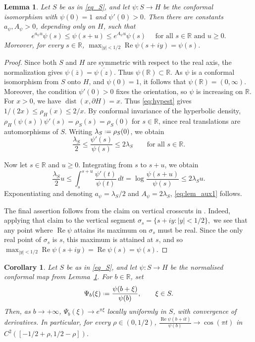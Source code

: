 \documentclass[a4paper, 11pt, reqno]{amsart}
\numberwithin{equation}{section}
\theoremstyle{plain}
\newtheorem{corollary}[theorem]{Corollary}
\newtheorem{lemma}[theorem]{Lemma}
\newcommand*{\defeq}{\mathrel{\vcenter{\baselineskip0.5ex \lineskiplimit0pt
 \hbox{\scriptsize.}\hbox{\scriptsize.}}}=}
\theoremstyle{remark}
\newcommand{\R}{{\mathbb{R}}}
\newcommand{\Rea}{\operatorname{Re }}
\newcommand{\dist}{\operatorname{dist}}
\begin{document}
\begin{lemma}\label{lem:psi_basic_estimates}
Let \(S\) be as in \eqref{eq_S}, and let \(\psi:S\to H\) be the conformal isomorphism with \(\psi(0)=1\) and \(\psi'(0)>0\). Then there are constants \(a_\psi,A_\psi>0\), depending only on \(H\), such that 
	\begin{equation}\label{eq:lem_aux1}
e^{a_\psi u}\psi(s)\leq\psi(s+u)\leq e^{A_\psi u}\psi(s) \quad \text{ for all } s\in\R \text{ and } u\geq0.
	\end{equation}
Moreover, for every \(s\in\R\), \(\max_{|y|<1/2}\Rea\psi(s+iy)=\psi(s)\).
\end{lemma}

\begin{proof}
Since both \(S\) and \(H\) are symmetric with respect to the real axis, the normalization gives \(\psi(\overline z)=\overline{\psi(z)}\). Thus \(\psi(\R)\subset\R\). As \(\psi\) is a conformal isomorphism from \(S\) onto \(H\), and \(\psi(0)=1\), it follows that \(\psi(\R)=(0,\infty)\). Moreover, the condition \(\psi'(0)>0\) fixes the orientation, so \(\psi\) is increasing on \(\R\). For \(x>0\), we have \(\dist(x,\partial H)=x\). Thus \eqref{eq:hypest} gives \(1/(2x)\le\rho_H(x)\le 2/x\). By conformal invariance of the hyperbolic density, \(\rho_H(\psi(s))\psi'(s)=\rho_S(s)=\rho_S(0)\) for \(s\in\R\), since real translations are automorphisms of \(S\). Writing \(\lambda_S\defeq\rho_S(0)\), we obtain
\[
\frac{\lambda_S}{2}\le \frac{\psi'(s)}{\psi(s)}\le 2\lambda_S
	\qquad \text{for all }s\in\R.
\]

Now let \(s\in\R\) and \(u\geq0\). Integrating from \(s\) to \(s+u\), we obtain
		\[
		\frac{\lambda_S}{2}u
		\leq \int_s^{s+u}\frac{\psi'(t)}{\psi(t)}\,dt= \log\frac{\psi(s+u)}{\psi(s)}
		\leq 2\lambda_S u.
		\]
		Exponentiating and denoting \(a_\psi=\lambda_S/2\) and \(A_\psi=2\lambda_S\), \eqref{eq:lem_aux1} follows.
	
The final assertion follows from the claim on vertical crosscuts in \cite[p.~13]{letidave_variations}. Indeed, applying that claim to the vertical segment $\sigma_s=\{s+iy: |y|<1/2\},$ we see that any point where \(\Rea \psi\) attains its maximum on
		\(\sigma_s\) must be real. Since the only real point of \(\sigma_s\) is
		\(s\), this maximum is attained at \(s\), and so
		$
		\max_{|y|<1/2}\Rea \psi(s+iy)=\Rea \psi(s)=\psi(s).
		$
\end{proof} 

	\begin{corollary}
	\label{cor:psi_large_real}Let \(S\) be as in \eqref{eq_S}, and let \(\psi:S\to H\) be the normalised conformal map from Lemma~\ref{lem:psi_basic_estimates}. For \(b\in\R\), set
	\[
	\Psi_b(\xi)\defeq \frac{\psi(b+\xi)}{\psi(b)},
	\qquad \xi\in S .
	\]
	Then, as \(b\to+\infty\),
	$
	\Psi_b(\xi)\longrightarrow e^{\pi \xi}
	$
	locally uniformly in \(S\), with convergence of derivatives. In particular,
	for every \(\rho\in(0,1/2)\),
	$
	\frac{\Rea \psi(b+it)}{\psi(b)}
	\longrightarrow
	\cos(\pi t)
	$
	in \(C^2([-1/2+\rho,1/2-\rho])\).
\end{corollary}
\end{document}
